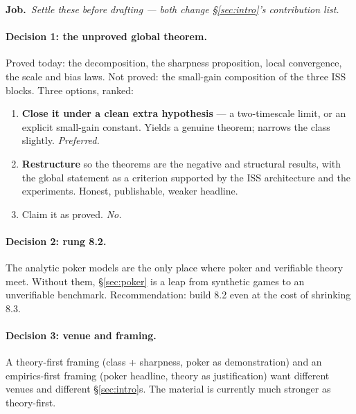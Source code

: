 \documentclass[11pt]{article}
\newcommand{\job}[1]{\par\smallskip\noindent
  \textcolor{jobc}{\textbf{Job.}}\ \emph{#1}\par\smallskip}
\theoremstyle{definition}
\theoremstyle{remark}
\begin{document}
\job{Settle these \emph{before} drafting --- both change \S\ref{sec:intro}'s
contribution list.}

\paragraph{Decision 1: the unproved global theorem.}
Proved today: the decomposition, the sharpness proposition, local convergence,
the scale and bias laws. Not proved: the small-gain composition of the three ISS
blocks. Three options, ranked:
\begin{enumerate}[leftmargin=1.6em]
\item \textbf{Close it under a clean extra hypothesis} --- a two-timescale limit,
  or an explicit small-gain constant. Yields a genuine theorem; narrows the class
  slightly. \emph{Preferred.}
\item \textbf{Restructure} so the theorems are the negative and structural
  results, with the global statement as a criterion supported by the ISS
  architecture and the experiments. Honest, publishable, weaker headline.
\item Claim it as proved. \emph{No.}
\end{enumerate}

\paragraph{Decision 2: rung 8.2.}
The analytic poker models are the only place where poker and verifiable theory
meet. Without them, \S\ref{sec:poker} is a leap from synthetic games to an
unverifiable benchmark. Recommendation: build 8.2 even at the cost of shrinking
8.3.

\paragraph{Decision 3: venue and framing.}
A theory-first framing (class + sharpness, poker as demonstration) and an
empirics-first framing (poker headline, theory as justification) want different
venues and different \S\ref{sec:intro}s. The material is currently much stronger
as theory-first.
\end{document}
